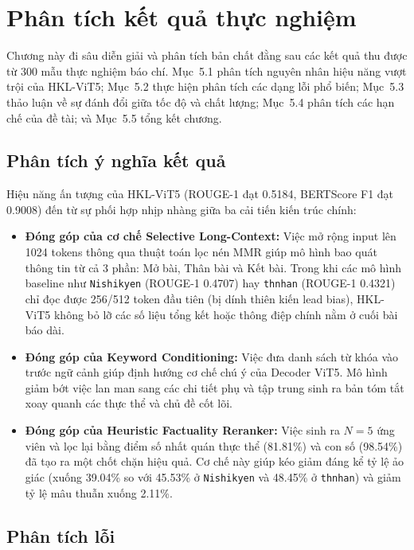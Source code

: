 \chapter{Phân tích kết quả thực nghiệm}

Chương này đi sâu diễn giải và phân tích bản chất đằng sau các kết quả thu được từ 300 mẫu thực nghiệm báo chí.
Mục~5.1 phân tích nguyên nhân hiệu năng vượt trội của HKL-ViT5;
Mục~5.2 thực hiện phân tích các dạng lỗi phổ biến;
Mục~5.3 thảo luận về sự đánh đổi giữa tốc độ và chất lượng;
Mục~5.4 phân tích các hạn chế của đề tài; và Mục~5.5 tổng kết chương.

\section{Phân tích ý nghĩa kết quả}

Hiệu năng ấn tượng của HKL-ViT5 (ROUGE-1 đạt 0.5184, BERTScore F1 đạt 0.9008) đến từ sự phối hợp nhịp nhàng giữa ba cải tiến kiến trúc chính:

\begin{itemize}
  \item \textbf{Đóng góp của cơ chế Selective Long-Context:} Việc mở rộng input lên 1024 tokens thông qua thuật toán lọc nén MMR giúp mô hình bao quát thông tin từ cả 3 phần: Mở bài, Thân bài và Kết bài. Trong khi các mô hình baseline như \texttt{Nishikyen} (ROUGE-1 0.4707) hay \texttt{thnhan} (ROUGE-1 0.4321) chỉ đọc được 256/512 token đầu tiên (bị dính thiên kiến lead bias), HKL-ViT5 không bỏ lỡ các số liệu tổng kết hoặc thông điệp chính nằm ở cuối bài báo dài.
  \item \textbf{Đóng góp của Keyword Conditioning:} Việc đưa danh sách từ khóa vào trước ngữ cảnh giúp định hướng cơ chế chú ý của Decoder ViT5. Mô hình giảm bớt việc lan man sang các chi tiết phụ và tập trung sinh ra bản tóm tắt xoay quanh các thực thể và chủ đề cốt lõi.
  \item \textbf{Đóng góp của Heuristic Factuality Reranker:} Việc sinh ra $N=5$ ứng viên và lọc lại bằng điểm số nhất quán thực thể (81.81\%) và con số (98.54\%) đã tạo ra một chốt chặn hiệu quả. Cơ chế này giúp kéo giảm đáng kể tỷ lệ ảo giác (xuống 39.04\% so với 45.53\% ở \texttt{Nishikyen} và 48.45\% ở \texttt{thnhan}) và giảm tỷ lệ mâu thuẫn xuống 2.11\%.
\end{itemize}

\section{Phân tích lỗi}

